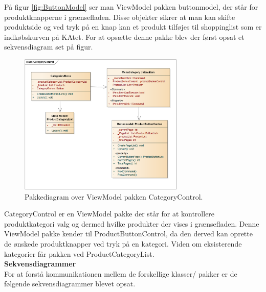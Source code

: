 På figur \ref{fig:ButtonModel} ser man ViewModel pakken buttonmodel, der står for produktknapperne i grænsefladen. Disse objekter sikrer at man kan skifte produktside og ved tryk på en knap kan et produkt tilføjes til shoppinglist som er indkøbskurven på \gls{KA}tet. For at opsætte denne pakke blev der først opsat et sekvensdiagram set på figur.

\begin{figure}[H]
	\centering
	\includegraphics[width=0.7\textwidth]{Systemdesign/Frontend/GUI/DesignOgStruktur/Pics/KlassediagramCategoryControl}
	\caption{Pakkediagram over ViewModel pakken CategoryControl.}
	\label{fig:CategoryControl}
\end{figure}

CategoryControl er en ViewModel pakke der står for at kontrollere produktkategori valg og dermed hvilke produkter der vises i grænsefladen. Denne ViewModel pakke kender til ProductButtonControl, da den derved kan oprette de ønskede produktknapper ved tryk på en kategori. Viden om eksisterende kategorier får pakken ved ProductCategoryList. \\

\textbf{Sekvensdiagrammer} \\
For at forstå kommunikationen mellem de forskellige klasser/ pakker er de følgende sekvensdiagrammer blevet opsat. \\

